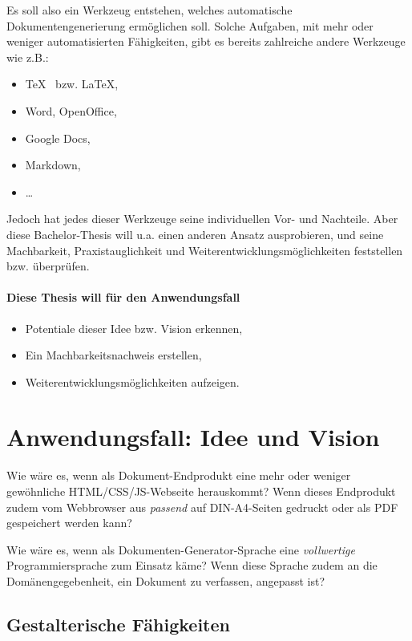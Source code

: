 Es soll also ein Werkzeug entstehen, welches automatische
Dokumentengenerierung ermöglichen soll. Solche Aufgaben,
mit mehr oder weniger automatisierten Fähigkeiten,
gibt es bereits zahlreiche andere Werkzeuge wie z.B.:

\begin{itemize}
  \item \TeX~ bzw. \LaTeX,
  \item Word, OpenOffice,
  \item Google Docs,
  \item Markdown,
  \item \ldots
\end{itemize}

Jedoch hat jedes dieser Werkzeuge seine individuellen Vor- und Nachteile.
Aber diese Bachelor-Thesis will u.a. einen anderen Ansatz ausprobieren, und
seine Machbarkeit, Praxistauglichkeit und Weiterentwicklungsmöglichkeiten
feststellen bzw. überprüfen.

\paragraph{Diese Thesis will für den Anwendungsfall}

\begin{itemize}
  \item Potentiale dieser Idee bzw. Vision erkennen,
  \item Ein Machbarkeitsnachweis erstellen,
  \item Weiterentwicklungsmöglichkeiten aufzeigen.
\end{itemize}

\section{Anwendungsfall: Idee und Vision}\label{sec-idee}

Wie wäre es, wenn als Dokument-Endprodukt eine mehr oder weniger
gewöhnliche HTML/CSS/JS-Webseite herauskommt?
Wenn dieses Endprodukt zudem vom Webbrowser aus \emph{passend} auf
DIN-A4-Seiten gedruckt oder als PDF gespeichert werden kann?

Wie wäre es, wenn als Dokumenten-\-Generator-\-Sprache eine \emph{vollwertige}
Programmiersprache zum Einsatz käme? Wenn diese Sprache zudem an die
Domänen\-gege\-ben\-heit, ein Dokument zu verfassen,
angepasst ist?

\subsection{Gestalterische Fähigkeiten}

